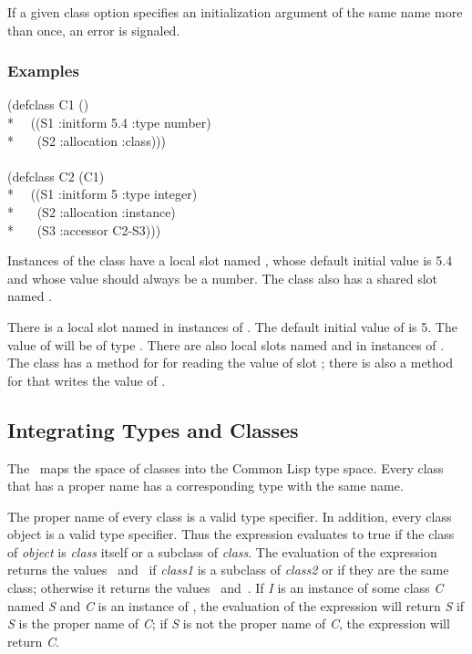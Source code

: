 If a given  class option specifies an
initialization argument of the same name more than once, an
error is signaled.

\subsubsection{Examples}

\begin{lisp}
(defclass C1 () \\*
~~((S1 :initform 5.4 :type number) \\*
~~~(S2 :allocation :class))) \\
\\
(defclass C2 (C1) \\*
~~((S1 :initform 5 :type integer)\\*
~~~(S2 :allocation :instance)\\*
~~~(S3 :accessor C2-S3)))
\end{lisp}

Instances of the class  have a local slot named , whose default
initial value is 5.4 and whose value should always be a number.
The class  also has a shared slot named .

There is a local slot named  in instances of .  The
default initial value of  is 5.  The value of  will be
of type .  There are also local slots named
 and  in instances of .  The class 
has a method for  for reading the value of slot ;
there is also a method for  that writes the
value of .

\subsection{Integrating Types and Classes} 
\label{Integrating-Types-and-Classes-SECTION} 

The \CLOS\ maps the space of classes into the Common Lisp type space.
Every class that has a proper name has a corresponding type with the same 
name.

The proper name of every class is a valid type specifier.  In
addition, every class object is a valid type specifier.  Thus the
expression  evaluates to true if the
class of \emph{object} is \emph{class} itself or a subclass of \emph{class}.
The evaluation of the expression  returns
the values ~and~ if \emph{class1} is a 
subclass of \emph{class2} or if they are the same class; otherwise it
returns the values ~and~.  If \emph{I} is an instance of some class
\emph{C} named \emph{S} and \emph{C} is an instance of , the
evaluation of the expression  will return \emph{S} if
\emph{S} is the proper name of \emph{C}; if \emph{S} is not the proper
name of \emph{C}, the expression  will
return \emph{C}.

